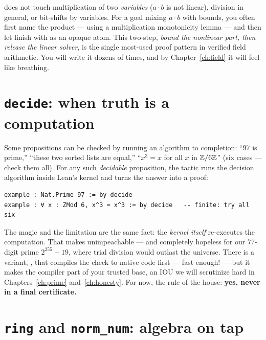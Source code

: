 \begin{pitfall}
 does not touch multiplication of two \emph{variables}
($a \cdot b$ is not linear), division in general, or bit-shifts by variables.
For a goal mixing $a \cdot b$ with bounds, you often first name the product
---  using a multiplication
monotonicity lemma --- and then let  finish with  as an
opaque atom. This two-step, \emph{bound the nonlinear part, then release the
linear solver}, is the single most-used proof pattern in verified field
arithmetic. You will write it dozens of times, and by Chapter~\ref{ch:field}
it will feel like breathing.
\end{pitfall}

\section{\texttt{decide}: when truth is a computation}

Some propositions can be checked by running an algorithm to completion:
``$97$ is prime,'' ``these two sorted lists are equal,'' ``$x^3 = x$ for all
$x$ in $\mathbb{Z}/6\mathbb{Z}$'' (six cases --- check them all). For any such
\emph{decidable} proposition, the  tactic runs the decision
algorithm inside Lean's kernel and turns the answer into a proof:

\begin{lstlisting}[language=Lean]
example : Nat.Prime 97 := by decide
example : ∀ x : ZMod 6, x^3 = x^3 := by decide   -- finite: try all six
\end{lstlisting}

The magic and the limitation are the same fact: the \emph{kernel itself}
re-executes the computation. That makes  unimpeachable --- and
completely hopeless for our 77-digit prime $2^{255}-19$, where trial division
would outlast the universe. There is a variant, , that
compiles the check to native code first --- fast enough! --- but it makes the
compiler part of your trusted base, an IOU we will scrutinize hard in
Chapters~\ref{ch:prime} and~\ref{ch:honesty}. For now, the rule of the house:
\textbf{ yes,  never in a final certificate.}

\section{\texttt{ring} and \texttt{norm\_num}: algebra on tap}

